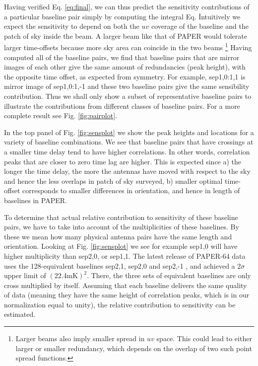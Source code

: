 \documentclass[twocolumn,apj,numberedappendix]{emulateapj}
\renewcommand\[{\begin{equation}}
\renewcommand\]{\end{equation}}
\begin{document}
Having verified Eq. \eqref{eq:final}, we can thus predict the sensitivity contributions of a
particular baseline pair simply by computing the integral Eq. \.
Intuitively we expect the sensitivity to depend on both the $uv$ coverage of the baseline and the patch of sky inside the beam. A larger beam like that of PAPER would tolerate larger time-offsets because more sky area can coincide in the two beams \footnote{Larger beams also imply smaller spread in $uv$ space. This could lead to either larger or smaller redundancy, which depends on the overlap of two such point spread functions.}
Having computed all of the baseline pairs, we find that baseline pairs that are mirror images of each other 
give the same amount of redundancies (peak height), with the opposite time offset, as expected from symmetry. 
For example, sep1,0:1,1 is mirror image of sep1,0:1,-1 and these two baseline pairs
give the same sensibility contribution. Thus we shall only show a subset of representative baseline pairs to illustrate the contributions from different classes of baseline pairs. For a more complete result see Fig. \ref{fig:pairplot}.  

In the top panel of Fig. \ref{fig:sensplot}
we show the peak heights and locations for a variety of baseline combinations.
We see that baseline pairs that have crossings at a smaller time delay
tend to have higher correlations. In other words, correlation peaks
that are closer to zero time lag are higher. This is expected since
a) the longer the time delay, the more the antennas have moved with respect
to the sky and hence the less overlaps in patch of sky surveyed, b) smaller optimal
time-offset corresponds to smaller differences in orientation, and hence in length of
baselines in PAPER. 




To determine that actual relative contribution to sensitivity of these
baseline pairs, we have to take into account of the multiplicities of
these baselines. By these we mean how many physical antenna pairs have the
same length and orientation. Looking at Fig. \ref{fig:sensplot}
we see for example sep1,0 will have higher multiplicity than sep2,0,
or sep1,1. The latest release of PAPER-64 data uses the 128-equivalent baselines sep2,1,
sep2,0 and sep2,-1 \citep{Ali2015}, and achieved a $2\sigma$ upper
limit of $(22.4\text{mK})^{2}$. There, the three sets of equivalent baselines
are only cross multiplied by itself. Assuming that each baseline delivers
the same quality of data (meaning they have the same height of correlation
peaks, which is in our normalization equal to unity), the relative
contribution to sensitivity can be estimated. 
\end{document}
